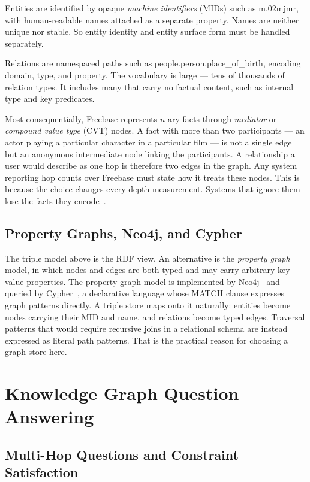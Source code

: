 Entities are identified by opaque \emph{machine identifiers} (MIDs)
such as \textsf{m.02mjmr}, with human-readable names attached as a separate
property. Names are neither unique nor stable. So entity identity and entity
surface form must be handled separately.

Relations are namespaced paths such as \textsf{people.person.place\_of\_birth},
encoding domain, type, and property. The vocabulary is large --- tens of
thousands of relation types. It includes many that carry no factual content,
such as internal type and key predicates.

Most consequentially, Freebase represents $n$-ary facts through
\emph{mediator} or \emph{compound value type} (CVT) nodes.
A fact with more than two participants --- an actor playing a particular
character in a particular film --- is not a single edge but an anonymous
intermediate node linking the participants. A relationship a user would describe
as one hop is therefore two edges in the graph. Any system reporting hop counts
over Freebase must state how it treats these nodes. This is because the choice
changes every depth measurement. Systems that ignore them lose the facts they
encode~\cite{xu2024generate}.

\subsection{Property Graphs, Neo4j, and Cypher}

The triple model above is the RDF view. An alternative is the \emph{property
graph} model, in which nodes and edges are both typed and
may carry arbitrary key--value properties. The property graph model is
implemented by Neo4j~\cite{robinson2015graph} and queried by
Cypher~\cite{francis2018cypher}, a declarative language whose \textsf{MATCH}
clause expresses graph patterns directly. A triple store maps onto it naturally:
entities become nodes carrying their MID and name, and relations become typed
edges. Traversal patterns that would require recursive joins in a relational
schema are instead expressed as literal path patterns. That is the practical
reason for choosing a graph store here.

\section{Knowledge Graph Question Answering}\label{sec:kgqa}

\subsection{Multi-Hop Questions and Constraint Satisfaction}

